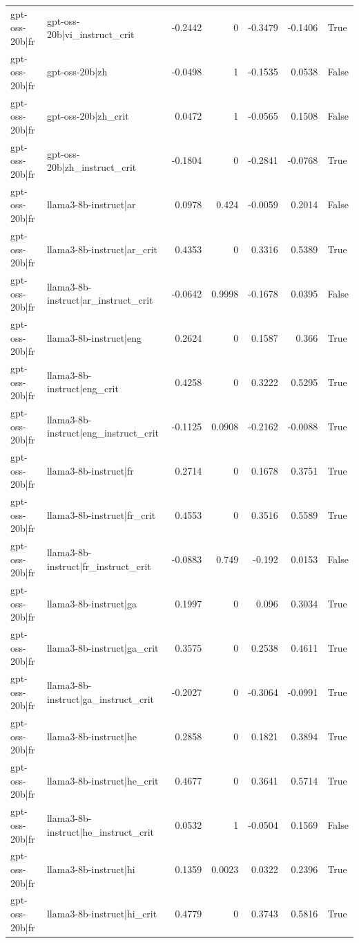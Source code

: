 \begin{table}
\begin{tabular}{l l r r r r l}
gpt-oss-20b|fr & gpt-oss-20b|vi_instruct_crit & -0.2442 & 0 & -0.3479 & -0.1406 & True \\
gpt-oss-20b|fr & gpt-oss-20b|zh & -0.0498 & 1 & -0.1535 & 0.0538 & False \\
gpt-oss-20b|fr & gpt-oss-20b|zh_crit & 0.0472 & 1 & -0.0565 & 0.1508 & False \\
gpt-oss-20b|fr & gpt-oss-20b|zh_instruct_crit & -0.1804 & 0 & -0.2841 & -0.0768 & True \\
gpt-oss-20b|fr & llama3-8b-instruct|ar & 0.0978 & 0.424 & -0.0059 & 0.2014 & False \\
gpt-oss-20b|fr & llama3-8b-instruct|ar_crit & 0.4353 & 0 & 0.3316 & 0.5389 & True \\
gpt-oss-20b|fr & llama3-8b-instruct|ar_instruct_crit & -0.0642 & 0.9998 & -0.1678 & 0.0395 & False \\
gpt-oss-20b|fr & llama3-8b-instruct|eng & 0.2624 & 0 & 0.1587 & 0.366 & True \\
gpt-oss-20b|fr & llama3-8b-instruct|eng_crit & 0.4258 & 0 & 0.3222 & 0.5295 & True \\
gpt-oss-20b|fr & llama3-8b-instruct|eng_instruct_crit & -0.1125 & 0.0908 & -0.2162 & -0.0088 & True \\
gpt-oss-20b|fr & llama3-8b-instruct|fr & 0.2714 & 0 & 0.1678 & 0.3751 & True \\
gpt-oss-20b|fr & llama3-8b-instruct|fr_crit & 0.4553 & 0 & 0.3516 & 0.5589 & True \\
gpt-oss-20b|fr & llama3-8b-instruct|fr_instruct_crit & -0.0883 & 0.749 & -0.192 & 0.0153 & False \\
gpt-oss-20b|fr & llama3-8b-instruct|ga & 0.1997 & 0 & 0.096 & 0.3034 & True \\
gpt-oss-20b|fr & llama3-8b-instruct|ga_crit & 0.3575 & 0 & 0.2538 & 0.4611 & True \\
gpt-oss-20b|fr & llama3-8b-instruct|ga_instruct_crit & -0.2027 & 0 & -0.3064 & -0.0991 & True \\
gpt-oss-20b|fr & llama3-8b-instruct|he & 0.2858 & 0 & 0.1821 & 0.3894 & True \\
gpt-oss-20b|fr & llama3-8b-instruct|he_crit & 0.4677 & 0 & 0.3641 & 0.5714 & True \\
gpt-oss-20b|fr & llama3-8b-instruct|he_instruct_crit & 0.0532 & 1 & -0.0504 & 0.1569 & False \\
gpt-oss-20b|fr & llama3-8b-instruct|hi & 0.1359 & 0.0023 & 0.0322 & 0.2396 & True \\
gpt-oss-20b|fr & llama3-8b-instruct|hi_crit & 0.4779 & 0 & 0.3743 & 0.5816 & True \\

\end{tabular}
\end{table}
